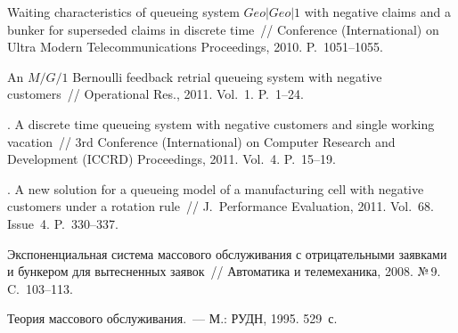 \begin{multicols}{2}
{{\begin{thebibliography}{99}
Waiting characteristics of queueing system $Geo|Geo|1$ with negative claims and a bunker for superseded claims in discrete 
time~//
Conference (International) on Ultra Modern Telecommunications Proceedings, 2010. P.~1051--1055.

An $M/G/1$ Bernoulli feedback retrial queueing system with negative customers~//
Operational Res., 2011. Vol.~1. P.~1--24.

.
A discrete time queueing system
with negative customers and single working vacation~// 3rd
 Conference (International) on Computer Research and Development
(ICCRD) Proceedings, 2011. Vol.~4. P.~15--19.

. A new solution for a queueing model of a
manufacturing cell with negative customers under a rotation rule~//
J.~Performance Evaluation, 2011. Vol.~68. Issue~4. P.~330--337.

Экспоненциальная система массового обслуживания с отрицательными заявками и
бункером для вытесненных заявок~// Автоматика и телемеханика, 2008. №\,9. C.~103--113.

\label{end\stat}

Теория массового обслуживания.~--- М.: РУДН, 1995. 529~с.




 \end{thebibliography}
}
}


\end{multicols}       
